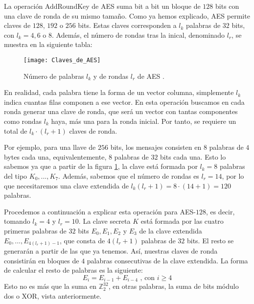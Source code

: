     La operación AddRoundKey de AES suma bit a bit un bloque de $128$ bits con una clave de ronda de su mismo tamaño. Como ya hemos explicado, AES permite claves de $128$, $192$ o $256$ bits. Estas claves corresponden a $l_{k}$ palabras de $32$ bits, con $l_{k} = 4, 6$ o $8$. Además, el número de rondas tras la inical, denominado $l_{r}$, se muestra en la siguiente tabla:

    \begin{figure}[H]
        \centering
        \texttt{[image: Claves\_de\_AES]}
        \caption{Número de palabras $l_{k}$ y de rondas $l_{r}$ de AES \cite{cryptoSchool}.}
        \label{fig:1.2}
    \end{figure}
    
    En realidad, cada palabra tiene la forma de un vector columna, simplemente $l_{k}$ indica cuantas filas componen a ese vector. En esta operación buscamos en cada ronda generar una clave de ronda, que será un vector con tantas componentes como rondas $l_{k}$ haya, más una para la ronda inicial. Por tanto, se requiere un total de $l_{k} \cdot (l_{r} + 1)$ claves de ronda.

    \begin{ejemplo}
        Por ejemplo, para una llave de $256$ bits, los mensajes consisten en $8$ palabras de $4$ bytes cada una, equivalentemente, $8$ palabras de $32$ bits cada una. Esto lo sabemos ya que a partir de la figura \ref{fig:1.2}, la clave está formada por $l_{k} = 8$ palabras del tipo $K_{0}, ... , K_{7}$. Además, sabemos que el número de rondas es $l_{r} = 14$, por lo que necesitaremos una clave extendida de $l_{k}(l_{r} + 1) = 8 \cdot (14 + 1) = 120$ palabras.
    \end{ejemplo}

    Procedemos a continuación a explicar esta operación para AES-$128$, es decir, tomando $l_{k} = 4$ y $l_{r} = 10$. La clave secreta $K$ está formada por las cuatro primeras palabras de $32$ bits $E_{0}, E_{1}, E_{2}$ y $E_{3}$ de la clave extendida $E_{0}, ... , E_{4(l_{r}+1)-1}$, que consta de $4(l_{r} + 1)$ palabras de $32$ bits. El resto se generarán a partir de las que ya tenemos. Así, nuestras claves de ronda consistirán en bloques de $4$ palabras consecutivas de la clave extendida. La forma de calcular el resto de palabras es la siguiente:
    \begin{equation}
        E_{i} = E_{i-1} + E_{i-4} \text{ , con } i \geq 4
    \end{equation}
    Esto no es más que la suma en $\mathbb{Z}_{2}^{32}$, en otras palabras, la suma de bits módulo dos o XOR, vista anteriormente. 
    
